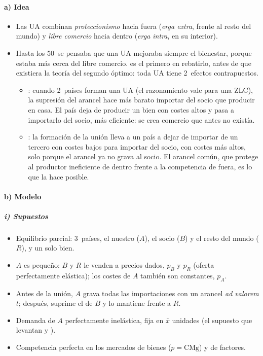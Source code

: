 \documentclass[11pt]{article}
\begin{document}
\paragraph{a) Idea}

\begin{itemize}
\item Las UA combinan \emph{proteccionismo} hacia fuera (\emph{erga extra}, frente al resto del mundo) y \emph{libre comercio} hacia dentro (\emph{erga intra}, en su interior).
\item Hasta los 50~se pensaba que una UA mejoraba siempre el bienestar, porque estaba más cerca del libre comercio. \textcite{Viner1950Customs} es el primero en rebatirlo, antes de que existiera la teoría del segundo óptimo: toda UA tiene 2~efectos contrapuestos.
  \begin{itemize}
  \item {}: cuando 2~países forman una UA (el razonamiento vale para una ZLC), la supresión del arancel hace más barato importar del socio que producir en casa. El país deja de producir un bien con costes altos y pasa a importarlo del socio, más eficiente: se crea comercio que antes no existía.
  \item {}: la formación de la unión lleva a un país a dejar de importar de un tercero con costes bajos para importar del socio, con costes más altos, solo porque el arancel ya no grava al socio. El arancel común, que protege al productor ineficiente de dentro frente a la competencia de fuera, es lo que la hace posible.
  \end{itemize}
\end{itemize}

\paragraph{b) Modelo}

\subparagraph{i) Supuestos}

\begin{itemize}
\item Equilibrio parcial: 3~países, el nuestro ($A$), el socio ($B$) y el resto del mundo ($R$), y un solo bien.
\item $A$ es pequeño: $B$ y $R$ le venden a precios dados, $p_B$ y $p_R$ (oferta perfectamente elástica); los costes de $A$ también son constantes, $p_A$.
\item Antes de la unión, $A$ grava todas las importaciones con un arancel \emph{ad valorem} $t$; después, suprime el de $B$ y lo mantiene frente a $R$.
\item Demanda de $A$ perfectamente inelástica, fija en $\bar{x}$ unidades (el supuesto que levantan  y ).
\item Competencia perfecta en los mercados de bienes ($p=\mathrm{CMg}$) y de factores.
\end{itemize}
\end{document}
